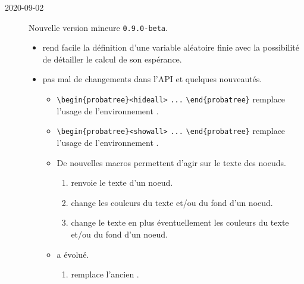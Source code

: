 \documentclass[12pt,a4paper]{article}
\begin{document}
\begin{description}
    \medskip
    \item[2020-09-02] Nouvelle version mineure \verb+0.9.0-beta+.
    
    \begin{itemize}[itemsep=.5em]
        \item {}
        	   rend facile la définition d'une variable aléatoire finie avec la possibilité de détailler le calcul de son espérance.
    
    
    
    
        \item {}
        	  pas mal de changements dans l'API et quelques nouveautés.
    
        \begin{itemize}[itemsep=.5em]
            \item \verb#\begin{probatree}<hideall># \verb#...# \verb#\end{probatree}#  remplace l'usage de l'environnement .
    
    
            \item \verb#\begin{probatree}<showall># \verb#...# \verb#\end{probatree}# remplace l'usage de l'environnement .
    
    
            \item De nouvelles macros permettent d'agir sur le texte des noeuds.
    
            \begin{enumerate}
            	\item {} renvoie le texte d'un noeud.
    
            	\item {} change les couleurs du texte et/ou du fond d'un noeud.
    
            	\item {} change le texte en plus éventuellement  les couleurs du texte et/ou du fond d'un noeud.
            \end{enumerate}
    
    
            \item {} a évolué.
    
            \begin{enumerate}
            	\item {} remplace l'ancien .
    

\end{enumerate}
\end{itemize}
\end{itemize}
\end{description}
\end{document}
